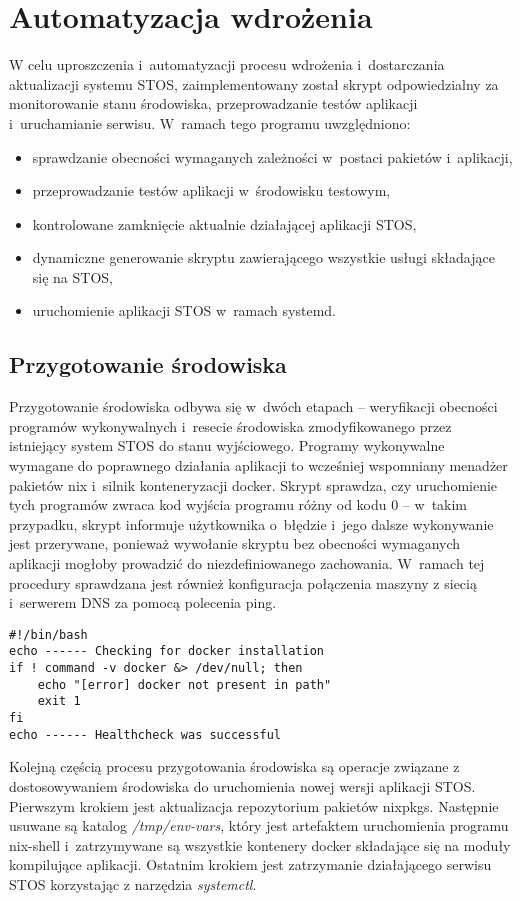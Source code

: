 
\section{Automatyzacja wdrożenia}
W celu uproszczenia i~automatyzacji procesu wdrożenia i~dostarczania aktualizacji systemu STOS, zaimplementowany został skrypt odpowiedzialny za monitorowanie stanu środowiska, przeprowadzanie testów aplikacji i~uruchamianie serwisu. W~ramach tego programu uwzględniono:
\begin{itemize}
	\item sprawdzanie obecności wymaganych zależności w~postaci pakietów i~aplikacji,
	\item przeprowadzanie testów aplikacji w~środowisku testowym,
	\item kontrolowane zamknięcie aktualnie działającej aplikacji STOS,
	\item dynamiczne generowanie skryptu zawierającego wszystkie usługi składające się na STOS,
	\item uruchomienie aplikacji STOS w~ramach systemd.
\end{itemize}
\subsection{Przygotowanie środowiska}
Przygotowanie środowiska odbywa się w~dwóch etapach -- weryfikacji obecności programów wykonywalnych i~resecie środowiska zmodyfikowanego przez istniejący system STOS do stanu wyjściowego. 
\newline \noindent Programy wykonywalne wymagane do poprawnego działania aplikacji to wcześniej wspomniany menadżer pakietów nix i~silnik konteneryzacji docker. Skrypt sprawdza, czy uruchomienie tych programów zwraca kod wyjścia programu różny od kodu 0 -- w~takim przypadku, skrypt informuje użytkownika o~błędzie i~jego dalsze wykonywanie jest przerywane, ponieważ wywołanie skryptu bez obecności wymaganych aplikacji mogłoby prowadzić do niezdefiniowanego zachowania. W~ramach tej procedury sprawdzana jest również konfiguracja połączenia maszyny z siecią i~serwerem DNS za pomocą polecenia ping.
\lstset{style=shell}
\begin{lstlisting}[caption = {Przykład weryfikacji obecności instalacji programu „docker” w~systemie.}]
#!/bin/bash
echo ------ Checking for docker installation 
if ! command -v docker &> /dev/null; then
    echo "[error] docker not present in path"
    exit 1
fi
echo ------ Healthcheck was successful 
\end{lstlisting}
\noindent Kolejną częścią procesu przygotowania środowiska są operacje związane z dostosowywaniem środowiska do uruchomienia nowej wersji aplikacji STOS. Pierwszym krokiem jest aktualizacja repozytorium pakietów nixpkgs. Następnie usuwane są katalog \textit{/tmp/env-vars}, który jest artefaktem uruchomienia programu nix-shell i~zatrzymywane są wszystkie kontenery docker składające się na moduły kompilujące aplikacji. Ostatnim krokiem jest zatrzymanie działającego serwisu STOS korzystając z narzędzia \textit{systemctl}.
